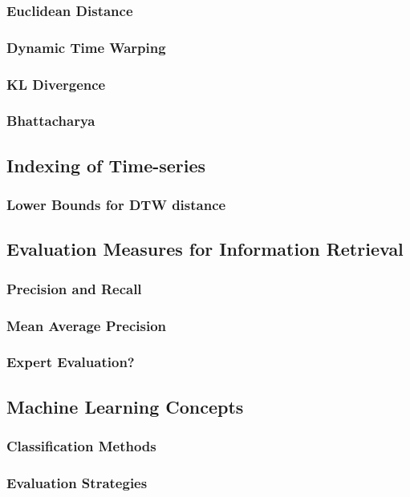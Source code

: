 \subsubsection{Euclidean Distance}
\subsubsection{Dynamic Time Warping}
\subsubsection{KL Divergence}
\subsubsection{Bhattacharya}

\subsection{Indexing of Time-series}
\subsubsection{Lower Bounds for DTW distance}

\subsection{Evaluation Measures for Information Retrieval}
\subsubsection{Precision and Recall}
\subsubsection{Mean Average Precision}
\subsubsection{Expert Evaluation?}

\subsection{Machine Learning Concepts}
\subsubsection{Classification Methods}
\subsubsection{Evaluation Strategies}

